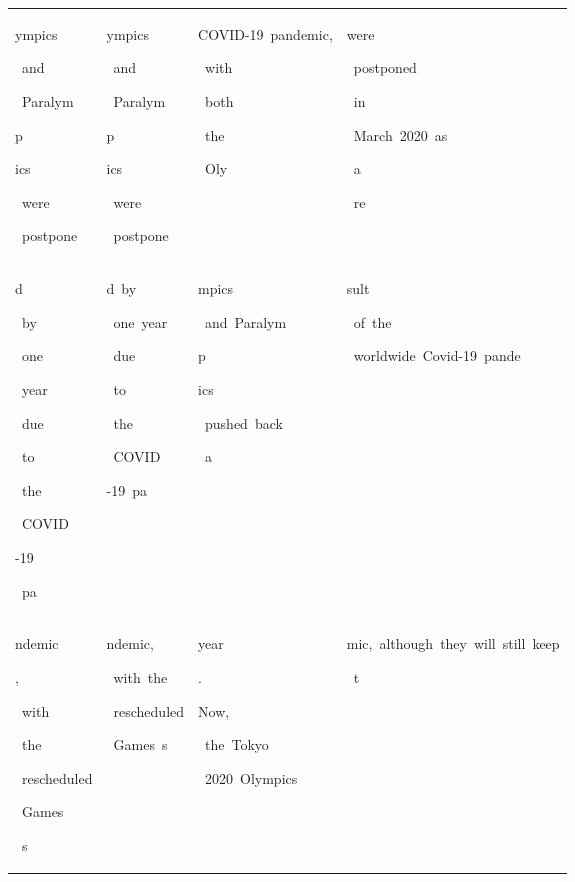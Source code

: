\begin{table}[h]
\begin{tabular}{ l l l l }
 \colorbox{cm_63!40}{\strut ympics}\colorbox{cm_42!40}{\strut \ and}\colorbox{cm_16!40}{\strut \ Paralym}\colorbox{cm_36!40}{\strut p}\colorbox{cm_32!40}{\strut ics}\colorbox{cm_29!40}{\strut \ were}\colorbox{cm_44!40}{\strut \ postpone} & \colorbox{cm_51!40}{\strut ympics}\colorbox{cm_63!40}{\strut \ and}\colorbox{cm_12!40}{\strut \ Paralym}\colorbox{cm_25!40}{\strut p}\colorbox{cm_38!40}{\strut ics}\colorbox{cm_0!40}{\strut \ were}\colorbox{cm_12!40}{\strut \ postpone} & \colorbox{cm_0!40}{\strut COVID-19\ pandemic,}\colorbox{cm_12!40}{\strut \ with}\colorbox{cm_0!40}{\strut \ both}\colorbox{cm_12!40}{\strut \ the}\colorbox{cm_0!40}{\strut \ Oly} & \colorbox{cm_38!40}{\strut were}\colorbox{cm_0!40}{\strut \ postponed}\colorbox{cm_12!40}{\strut \ in}\colorbox{cm_0!40}{\strut \ March\ 2020\ as}\colorbox{cm_12!40}{\strut \ a}\colorbox{cm_0!40}{\strut \ re} \\ 
 \colorbox{cm_44!40}{\strut d}\colorbox{cm_13!40}{\strut \ by}\colorbox{cm_0!40}{\strut \ one}\colorbox{cm_39!40}{\strut \ year}\colorbox{cm_34!40}{\strut \ due}\colorbox{cm_31!40}{\strut \ to}\colorbox{cm_33!40}{\strut \ the}\colorbox{cm_40!40}{\strut \ COVID}\colorbox{cm_32!40}{\strut -19}\colorbox{cm_34!40}{\strut \ pa} & \colorbox{cm_12!40}{\strut d\ by}\colorbox{cm_0!40}{\strut \ one\ year}\colorbox{cm_12!40}{\strut \ due}\colorbox{cm_25!40}{\strut \ to}\colorbox{cm_38!40}{\strut \ the}\colorbox{cm_51!40}{\strut \ COVID}\colorbox{cm_63!40}{\strut -19\ pa} & \colorbox{cm_0!40}{\strut mpics}\colorbox{cm_12!40}{\strut \ and\ Paralym}\colorbox{cm_25!40}{\strut p}\colorbox{cm_38!40}{\strut ics}\colorbox{cm_0!40}{\strut \ pushed\ back}\colorbox{cm_12!40}{\strut \ a}\colorbox{cm_0!40}{\strut \ } & \colorbox{cm_0!40}{\strut sult}\colorbox{cm_12!40}{\strut \ of\ the}\colorbox{cm_0!40}{\strut \ worldwide\ Covid-19\ pande} \\ 
 \colorbox{cm_34!40}{\strut ndemic}\colorbox{cm_63!40}{\strut ,}\colorbox{cm_0!40}{\strut \ with}\colorbox{cm_31!40}{\strut \ the}\colorbox{cm_14!40}{\strut \ rescheduled}\colorbox{cm_40!40}{\strut \ Games}\colorbox{cm_63!40}{\strut \ s} & \colorbox{cm_63!40}{\strut ndemic,}\colorbox{cm_12!40}{\strut \ with\ the}\colorbox{cm_0!40}{\strut \ rescheduled}\colorbox{cm_12!40}{\strut \ Games\ s} & \colorbox{cm_0!40}{\strut year}\colorbox{cm_12!40}{\strut .}\colorbox{cm_25!40}{\strut }\colorbox{cm_0!40}{\strut Now,}\colorbox{cm_12!40}{\strut \ the\ Tokyo}\colorbox{cm_0!40}{\strut \ 2020\ Olympics\ } & \colorbox{cm_0!40}{\strut mic,\ although\ they\ will\ still\ keep}\colorbox{cm_12!40}{\strut \ t} \\ 

\end{tabular}
\end{table}
